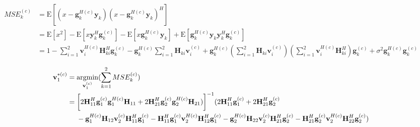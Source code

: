 \documentclass[11pt, oneside]{article}   	%
\begin{document}
\begin{align*}
MSE^{(c)}_{k} &= \mathrm{E}	[	(	x-\textbf{g}^{H(c)}_{k}	\textbf{y}_{k}	)(x-\textbf{g}^{H(c)}_{k}	\textbf{y}_{k})^{H}	] \\
		       & = \mathrm{E}[x^{2}]	 - \mathrm{E}[x	\textbf{y}_{k}^{H} \textbf{g}^{(c)}_{k}]	
		       					-  \mathrm{E}[x	\textbf{g}_{k}^{H(c)} \textbf{y}_{k}]
							+ \mathrm{E}[\textbf{g}_{k}^{H(c)} \textbf{y}_{k}	\textbf{y}_{k}^{H} \textbf{g}^{(c)}_{k}]			\\
		       & = 1 - \displaystyle\sum_{i=1}^{2}	\textbf{v}^{H(c)}_{i}	\textbf{H}^{H}_{ki}	\textbf{g}^{(c)}_{k}
		       		- \textbf{g}^{H(c)}_{k}		\displaystyle\sum_{i=1}^{2}	\textbf{H}_{ki}	\textbf{v}^{(c)}_{i}
				+\textbf{g}^{H(c)}_{k}		(\displaystyle\sum_{i=1}^{2}\textbf{H}_{ki}\textbf{v}^{(c)}_{i})
									(\displaystyle\sum_{i=1}^{2}\textbf{v}^{H(c)}_{i}\textbf{H}^{H}_{ki})	\textbf{g}^{(c)}_{k}
				+\sigma^2		\textbf{g}^{H(c)}_{k}	 \textbf{g}^{(c)}_{k}
\end{align*}

\begin{align*}
\textbf{v}^{*(c)}_{1}  &= \operatornamewithlimits{argmin}_{\textbf{v}^{(c)}_{1}}	(\displaystyle\sum_{k=1}^{2}	MSE^{(c)}_{k})	\\
			       &=\bigg[ 2	\textbf{H}^{H}_{11}	\textbf{g}^{(c)}_{1}	\textbf{g}^{H(c)}_{1}		\textbf{H}_{11}
				   +	2	\textbf{H}^{H}_{21}	\textbf{g}^{(c)}_{2}	\textbf{g}^{H(c)}_{2}		\textbf{H}_{21})
				   \bigg]^{-1} 
				   (2	\textbf{H}^{H}_{11}	\textbf{g}^{(c)}_{1}	+	2	\textbf{H}^{H}_{21}	\textbf{g}^{(c)}_{2}	\\
				   &\ \ \ \ -	\textbf{g}^{H(c)}_{1}	\textbf{H}_{12}	\textbf{v}^{(c)}_{2} 	\textbf{H}^{H}_{11}	\textbf{g}^{(c)}_{1}
				   -	\textbf{H}^{H}_{11}	\textbf{g}^{(c)}_{1}	\textbf{v}^{H(c)}_{2}	\textbf{H}^{H}_{12}	\textbf{g}^{(c)}_{1}
				   -	\textbf{g}^{H(c)}_{2}	\textbf{H}_{22}	\textbf{v}^{(c)}_{2} 	\textbf{H}^{H}_{21}	\textbf{g}^{(c)}_{2}
				   -	\textbf{H}^{H}_{21}	\textbf{g}^{(c)}_{2}	\textbf{v}^{H(c)}_{2}	\textbf{H}^{H}_{22}	\textbf{g}^{(c)}_{2}
				   )
\end{align*}
\end{document}
